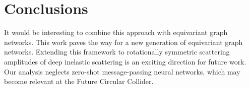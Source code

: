 \section{Conclusions}\label{sec:conclusions}

It would be interesting to combine this approach with equivariant graph
networks. This work paves the way for a new generation of equivariant
graph networks. Extending this framework to rotationally symmetric
scattering amplitudes of deep inelastic scattering is an exciting
direction for future work. Our analysis neglects zero-shot
message-passing neural networks, which may become relevant at the Future
Circular Collider.

